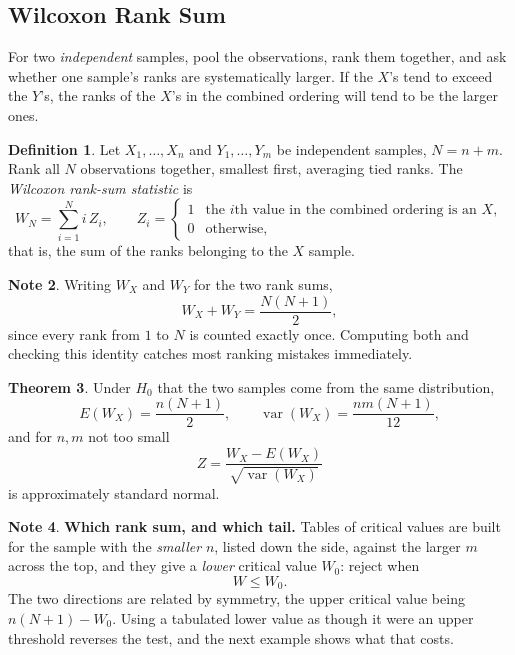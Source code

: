 \documentclass[11pt,a4paper]{article}
\theoremstyle{definition}
\newtheorem{thm}{Theorem}[section]
\newtheorem{definition}[thm]{Definition}
\newtheorem{note}[thm]{Note}
\begin{document}
\subsection{Wilcoxon Rank Sum}

For two \emph{independent} samples, pool the observations, rank them together, and
ask whether one sample's ranks are systematically larger. If the $X$'s tend to
exceed the $Y$'s, the ranks of the $X$'s in the combined ordering will tend to be
the larger ones.

\begin{definition}
Let $X_1,\ldots,X_n$ and $Y_1,\ldots,Y_m$ be independent samples, $N = n+m$. Rank
all $N$ observations together, smallest first, averaging tied ranks. The
\emph{Wilcoxon rank-sum statistic} is
$$W_N = \sum^{N}_{i=1} i\,Z_i,
\qquad
Z_i = \begin{cases}
1 & \text{the } i\text{th value in the combined ordering is an } X,\\
0 & \text{otherwise},
\end{cases}$$
that is, the sum of the ranks belonging to the $X$ sample.
\end{definition}

\begin{note}
Writing $W_X$ and $W_Y$ for the two rank sums,
$$W_X + W_Y = \dfrac{N(N+1)}{2},$$
since every rank from $1$ to $N$ is counted exactly once. Computing both and
checking this identity catches most ranking mistakes immediately.
\end{note}

\begin{thm}
Under $H_0$ that the two samples come from the same distribution,
$$E\left(W_X\right) = \dfrac{n(N+1)}{2},
\qquad
\operatorname{var}\left(W_X\right) = \dfrac{nm(N+1)}{12},$$
and for $n, m$ not too small
$$Z = \dfrac{W_X - E(W_X)}{\sqrt{\operatorname{var}(W_X)}}$$
is approximately standard normal.
\end{thm}

\begin{note}
\textbf{Which rank sum, and which tail.} Tables of critical values are built for
the sample with the \emph{smaller} $n$, listed down the side, against the larger
$m$ across the top, and they give a \emph{lower} critical value $W_0$: reject when
$$W \leq W_0 .$$
The two directions are related by symmetry, the upper critical value being
$n(N+1) - W_0$. Using a tabulated lower value as though it were an upper threshold
reverses the test, and the next example shows what that costs.
\end{note}
\end{document}
